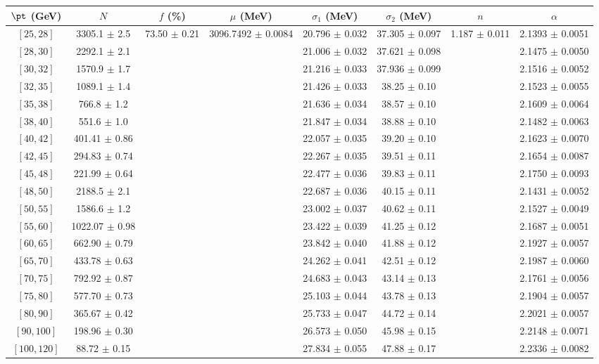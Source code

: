 \begin{tabular}{c||c|c|c|c|c|c|c}
$\pt$ (GeV) & $N$ & $f$ (\%) & $\mu$ (MeV) & $\sigma_1$ (MeV) & $\sigma_2$ (MeV) & $n$ & $\alpha$ \\
\hline
$[25, 28]$ & 3305.1 $\pm$ 2.5 & \multirow{19}{*}{73.50 $\pm$ 0.21} & \multirow{19}{*}{3096.7492 $\pm$ 0.0084} & 20.796 $\pm$ 0.032 & 37.305 $\pm$ 0.097 & \multirow{19}{*}{1.187 $\pm$ 0.011} & 2.1393 $\pm$ 0.0051\\
$[28, 30]$ & 2292.1 $\pm$ 2.1 &  &  & 21.006 $\pm$ 0.032 & 37.621 $\pm$ 0.098 &  & 2.1475 $\pm$ 0.0050\\
$[30, 32]$ & 1570.9 $\pm$ 1.7 &  &  & 21.216 $\pm$ 0.033 & 37.936 $\pm$ 0.099 &  & 2.1516 $\pm$ 0.0052\\
$[32, 35]$ & 1089.1 $\pm$ 1.4 &  &  & 21.426 $\pm$ 0.033 & 38.25 $\pm$ 0.10 &  & 2.1523 $\pm$ 0.0055\\
$[35, 38]$ & 766.8 $\pm$ 1.2 &  &  & 21.636 $\pm$ 0.034 & 38.57 $\pm$ 0.10 &  & 2.1609 $\pm$ 0.0064\\
$[38, 40]$ & 551.6 $\pm$ 1.0 &  &  & 21.847 $\pm$ 0.034 & 38.88 $\pm$ 0.10 &  & 2.1482 $\pm$ 0.0063\\
$[40, 42]$ & 401.41 $\pm$ 0.86 &  &  & 22.057 $\pm$ 0.035 & 39.20 $\pm$ 0.10 &  & 2.1623 $\pm$ 0.0070\\
$[42, 45]$ & 294.83 $\pm$ 0.74 &  &  & 22.267 $\pm$ 0.035 & 39.51 $\pm$ 0.11 &  & 2.1654 $\pm$ 0.0087\\
$[45, 48]$ & 221.99 $\pm$ 0.64 &  &  & 22.477 $\pm$ 0.036 & 39.83 $\pm$ 0.11 &  & 2.1750 $\pm$ 0.0093\\
$[48, 50]$ & 2188.5 $\pm$ 2.1 &  &  & 22.687 $\pm$ 0.036 & 40.15 $\pm$ 0.11 &  & 2.1431 $\pm$ 0.0052\\
$[50, 55]$ & 1586.6 $\pm$ 1.2 &  &  & 23.002 $\pm$ 0.037 & 40.62 $\pm$ 0.11 &  & 2.1527 $\pm$ 0.0049\\
$[55, 60]$ & 1022.07 $\pm$ 0.98 &  &  & 23.422 $\pm$ 0.039 & 41.25 $\pm$ 0.12 &  & 2.1687 $\pm$ 0.0051\\
$[60, 65]$ & 662.90 $\pm$ 0.79 &  &  & 23.842 $\pm$ 0.040 & 41.88 $\pm$ 0.12 &  & 2.1927 $\pm$ 0.0057\\
$[65, 70]$ & 433.78 $\pm$ 0.63 &  &  & 24.262 $\pm$ 0.041 & 42.51 $\pm$ 0.12 &  & 2.1987 $\pm$ 0.0060\\
$[70, 75]$ & 792.92 $\pm$ 0.87 &  &  & 24.683 $\pm$ 0.043 & 43.14 $\pm$ 0.13 &  & 2.1761 $\pm$ 0.0056\\
$[75, 80]$ & 577.70 $\pm$ 0.73 &  &  & 25.103 $\pm$ 0.044 & 43.78 $\pm$ 0.13 &  & 2.1904 $\pm$ 0.0057\\
$[80, 90]$ & 365.67 $\pm$ 0.42 &  &  & 25.733 $\pm$ 0.047 & 44.72 $\pm$ 0.14 &  & 2.2021 $\pm$ 0.0057\\
$[90, 100]$ & 198.96 $\pm$ 0.30 &  &  & 26.573 $\pm$ 0.050 & 45.98 $\pm$ 0.15 &  & 2.2148 $\pm$ 0.0071\\
$[100, 120]$ & 88.72 $\pm$ 0.15 &  &  & 27.834 $\pm$ 0.055 & 47.88 $\pm$ 0.17 &  & 2.2336 $\pm$ 0.0082\\
\end{tabular}
